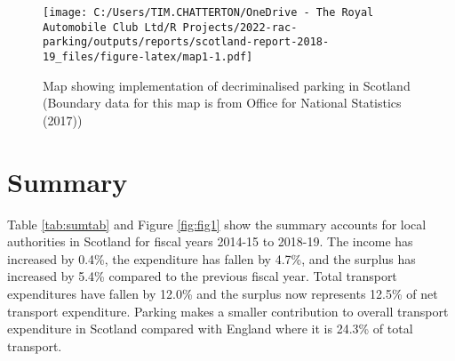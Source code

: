 \documentclass[
  12pt,
]{article}
\begin{document}
\begin{figure}
\centering
\texttt{[image: C:/Users/TIM.CHATTERTON/OneDrive - The Royal Automobile Club Ltd/R Projects/2022-rac-parking/outputs/reports/scotland-report-2018-19\_files/figure-latex/map1-1.pdf]}
\caption{\label{fig:map1}Map showing implementation of decriminalised parking in Scotland (Boundary data for this map is from Office for National Statistics (2017))}
\end{figure}

\hypertarget{summary}{%
\section{Summary}\label{summary}}

Table \ref{tab:sumtab} and Figure \ref{fig:fig1} show the summary accounts for local authorities in Scotland for fiscal years 2014-15 to 2018-19. The income has
increased by 0.4\%, the expenditure has
fallen by 4.7\%, and the surplus has
increased by 5.4\%
compared to the previous fiscal year. Total transport expenditures have
fallen by 12.0\% and the surplus now represents 12.5\% of net transport expenditure. Parking makes a
smaller contribution to overall transport expenditure in Scotland compared with England where it is 24.3\% of total transport.

\newpage

\begingroup\fontsize{10}{12}\selectfont
\end{document}
